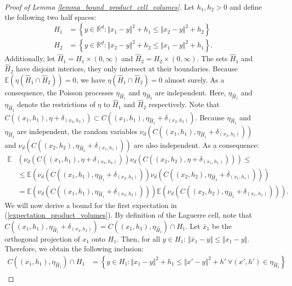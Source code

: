 \documentclass{article}
\newcommand{\RR}{\mathbb{R}}
\newcommand{\EE}{\mathbb{E}}
\theoremstyle{plain}
\theoremstyle{remark}
\theoremstyle{definition}
\begin{document}
\begin{proof}[Proof of Lemma \ref{lemma_bound_product_cell_volumes}]
    Let $h_1,h_2 > 0$ and define the following two half spaces:
    \begin{align*}
        H_1 &= \left\{y \in \RR^d: \Vert x_1 - y \Vert^2 + h_1 \leq \Vert x_2 - y\Vert^2 + h_2 \right\}\\
        H_2 &= \left\{y \in \RR^d: \Vert x_2 - y \Vert^2 + h_2 \leq \Vert x_1 - y\Vert^2 + h_1 \right\}.
    \end{align*}
    Additionally, let $\hat{H}_1 = H_1 \times (0,\infty)$ and $\hat{H}_2 = H_2 \times (0,\infty)$. The sets $\hat{H}_1$ and $\hat{H}_2$ have disjoint interiors, they only intersect at their boundaries. Because $\EE(\eta(\hat{H}_1 \cap \hat{H}_2)) = 0$, we have $\eta(\hat{H}_1 \cap \hat{H}_2) = 0$ almost surely. As a consequence, the Poisson processes $\eta_{\hat{H}_1}$ and $\eta_{\hat{H}_2}$ are independent. Here, $\eta_{\hat{H}_1}$ and $\eta_{\hat{H}_2}$ denote the restrictions of $\eta$ to $\hat{H}_1$ and $\hat{H}_2$ respectively. Note that $C((x_1,h_1),\eta+\delta_{(x_2,h_2)}) \subset C((x_1,h_1),\eta_{\hat{H}_1}+\delta_{(x_2,h_2)})$. Because $\eta_{\hat{H}_1}$ and $\eta_{\hat{H}_2}$ are independent, the random variables $\nu_d(C((x_1,h_1),\eta_{\hat{H}_1}+\delta_{(x_2,h_2)}))$ and $\nu_d(C((x_2,h_2),\eta_{\hat{H}_2}+\delta_{(x_1,h_1)}))$ are also independent. As a consequence:
    \begin{align}
        \EE&\left(\nu_d(C((x_1,h_1),\eta+\delta_{(x_2,h_2)}))\nu_d(C((x_2,h_2),\eta+\delta_{(x_1,h_1)})) \right) \leq \nonumber \\
        &\leq \EE\left(\nu_d(C((x_1,h_1),\eta_{\hat{H}_1}+\delta_{(x_2,h_2)}))\nu_d(C((x_2,h_2),\eta_{\hat{H}_2}+\delta_{(x_1,h_1)})) \right) \nonumber \\
        &= \EE\left(\nu_d(C((x_1,h_1),\eta_{\hat{H}_1}+\delta_{(x_2,h_2)}))\right)\EE\left(\nu_d(C((x_2,h_2),\eta_{\hat{H}_2}+\delta_{(x_1,h_1)})) \right). \label{expectation_product_volumes}
    \end{align}
    We will now derive a bound for the first expectation in (\ref{expectation_product_volumes}). By definition of the Laguerre cell, note that $C((x_1,h_1),\eta_{\hat{H}_1}+\delta_{(x_2,h_2)}) = C((x_1,h_1),\eta_{\hat{H}_1}) \cap H_1$. Let $\bar{x}_1$ be the orthogonal projection of $x_1$ onto $H_1$. Then, for all $y \in H_1$: $\Vert \bar{x}_1 - y\Vert \leq \Vert x_1 - y\Vert$. Therefore, we obtain the following inclusion:
    \begin{align}
        C\left((x_1,h_1),\eta_{\hat{H}_1}\right) \cap H_1 &= \left\{y \in H_1: \Vert x_1 - y\Vert^2 + h_1 \leq  \Vert x' - y\Vert^2 + h' \ \forall (x',h') \in \eta_{\hat{H}_1} \right\} \nonumber\\

\end{align}
\end{proof}
\end{document}
